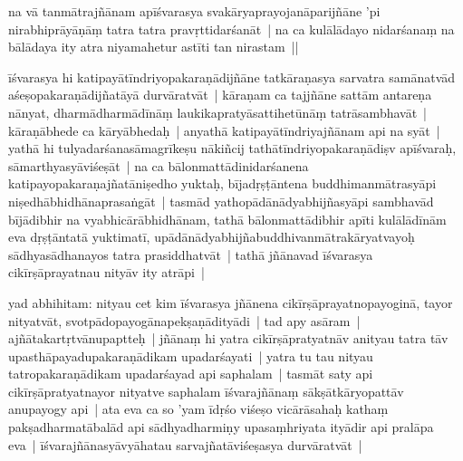 \documentclass[article,a4paper]{memoir}
\begin{document}
	  \pstart na vā\- tanmā\-trajñā\-nam apī\-śvarasya  svakā\-ryaprayojanā\-parijñā\-ne 'pi nirabhiprā\-yā\-ṇā\-ṃ tatra tatra pravṛttidarśanā\-t | na ca kulā\-lā\-dayo nidarśanaṃ na bā\-lā\-daya ity atra niyamahetur astī\-\label{nk-150.14}ti tan nirastam ||
	\pend
      

	  \pstart ī\-śvarasya hi katipayā\-tī\-ndriyopakaraṇā\-dijñā\-ne tatkā\-raṇasya sarvatra samā\-natvā\-d aśeṣopakaraṇā\-dijñatā\-yā\- durvā\-ratvā\-t | kā\-raṇam ca tajjñā\-ne sattā\-m antareṇa nā\-nyat, dharmā\-dharmā\-dī\-nā\-ṃ laukikapratyā\-sattihetū\-nā\-ṃ tatrā\-sambhavā\-t | kā\-raṇā\-bhede ca kā\-ryā\-bhedaḥ | anyathā\- katipayā\-tī\-ndriyajñā\-nam api na syā\-t | yathā\- hi  tulyadarśanasā\-magrī\-keṣu nā\-kiñcij tathā\-tī\-ndriyopakaraṇā\-diṣv apī\-śvaraḥ, sā\-marthyasyā\-viśeṣā\-t | na ca bā\-lonmattā\-dinidarśanena katipayopakaraṇajñatā\-niṣedho yuktaḥ, bī\-jadṛṣṭā\-ntena buddhimanmā\-trasyā\-pi niṣedhā\-bhidhā\-naprasaṅgā\-t | tasmā\-d yathopā\-dā\-nā\-dyabhijñasyā\-pi sambhavā\-d bī\-jā\-dibhir na vyabhicā\-rā\-bhidhā\-nam, tathā\- bā\-lonmattā\-dibhir apī\-ti kulā\-lā\-dī\-nā\-m eva dṛṣṭā\-ntatā\- yuktimatī\-, upā\-dā\-nā\-dyabhijñabuddhivanmā\-trakā\-ryatvayoḥ sā\-dhyasā\-dhanayos tatra prasiddhatvā\-t | tathā\- jñā\-navad ī\-śvarasya cikī\-rṣā\-prayatnau nityā\-v ity atrā\-pi |
	\pend
      

	  \pstart yad abhihitam: nityau cet kim ī\-śvarasya jñā\-nena cikī\-rṣā\-prayatnopayoginā\-, tayor nityatvā\-t, svotpā\-dopayogā\-napekṣaṇā\-dityā\-di | tad apy asā\-ram | ajñā\-takartṛtvā\-nupaptteḥ | jñā\-naṃ hi yatra cikī\-rṣā\-pratyatnā\-v anityau tatra tā\-v upasthā\-payadupakaraṇā\-dikam upadarśayati | yatra tu tau nityau tatropakaraṇā\-dikam upadarśayad api saphalam | tasmā\-t saty api cikī\-rṣā\-pratyatnayor nityatve saphalam ī\-śvarajñā\-naṃ sā\-kṣā\-tkā\-ryopattā\-v anupayogy api | ata eva ca so 'yam ī\-dṛśo viśeṣo vicā\-rā\-sahaḥ kathaṃ pakṣadharmatā\-balā\-d api sā\-dhyadharmiṇy upasaṃhriyata ityā\-dir api pralā\-pa eva | ī\-śvarajñā\-nasyā\-vyā\-hatau sarvajñatā\-viśeṣasya durvā\-ratvā\-t |
	\pend
      
\end{document}
